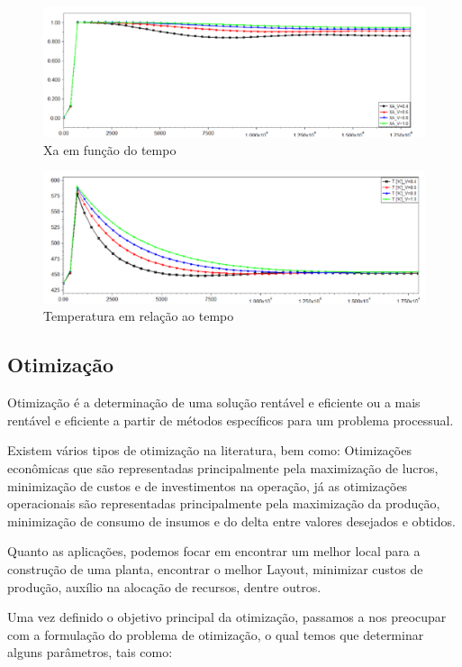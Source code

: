 \documentclass[
	12pt,				%
	openright,			%
	oneside,			%
	a4paper,			%
	english,			%
	french,				%
	spanish,			%
	brazil				%
	]{abntex2}
\begin{document}
\begin{figure}[H]
\centering
\includegraphics[scale=0.3]{exemplo1.png} 
\caption{Xa em função do tempo}
\label{Modelo de exemplo 1}
\end{figure}

\begin{figure}[H]
\centering
\includegraphics[scale=0.3]{exemplo2.png} 
\caption{Temperatura em relação ao tempo}
\label{Modelo de exemplo 2}
\end{figure}


\subsection{Otimização}

Otimização é a determinação de uma solução rentável e eficiente ou a mais rentável e eficiente a partir de métodos específicos para um problema processual.

Existem vários tipos de otimização na literatura, bem como: Otimizações econômicas que são representadas principalmente pela maximização de lucros, minimização de custos e de investimentos na operação, já as otimizações operacionais são representadas principalmente pela maximização da produção, minimização de consumo de insumos e do delta entre valores desejados e obtidos. 
	
Quanto as aplicações, podemos focar em encontrar um melhor local para a construção de uma planta, encontrar o melhor Layout, minimizar custos de produção, auxílio na alocação de recursos, dentre outros.
	
Uma vez definido o objetivo principal da otimização, passamos a nos preocupar com a formulação do problema de otimização, o qual temos que determinar alguns parâmetros, tais como:
	
\end{document}
